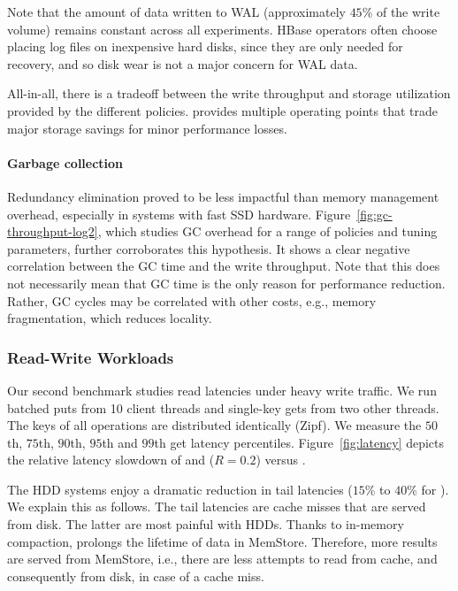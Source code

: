 Note that the amount of data written to WAL %
(approximately $45$\% of the write volume) remains constant across all  experiments. 
HBase operators often choose placing log files on inexpensive hard disks, since they are only needed for recovery,
and so disk wear is not a major concern for WAL data.

All-in-all, there is a tradeoff between the write throughput and storage utilization 
provided by the different \sys\/ policies. \adp\/ provides multiple operating points that trade major 
storage savings for minor performance losses.

\paragraph{Garbage collection}
 Redundancy elimination proved to be less impactful 
than memory management overhead, especially in systems with fast SSD hardware. 
Figure~\ref{fig:gc-throughput-log2}, which studies GC overhead for a range of policies and tuning 
parameters, further corroborates this hypothesis. It shows a clear negative correlation between the 
GC time and the write throughput. 
Note that this does not necessarily mean that GC time is the only reason for performance reduction. Rather,
GC cycles may be correlated with other costs, e.g., memory fragmentation, which reduces locality.


\subsubsection{Read-Write Workloads}

Our second benchmark studies read latencies under heavy write traffic. 
We run batched puts from 10 client threads and single-key gets from two other threads. 
The keys of all operations are distributed identically (Zipf). We measure the $50$th, 
$75$th, $90$th, $95$th and $99$th get latency percentiles. Figure~\ref{fig:latency} 
depicts the relative latency slowdown of \basic\/ and \adp\/ ($R=0.2$) versus \none.

The HDD systems enjoy a dramatic reduction in tail latencies ($15$\% to $40$\% for \adp). 
We explain this as follows. The tail latencies are cache misses that are served from disk. 
The latter are most painful with HDDs. Thanks to in-memory compaction, \adp\/ prolongs 
the lifetime of data in MemStore. Therefore, more results are served from MemStore, i.e., 
there are less attempts to read from cache, and consequently from disk, in case of a cache miss.  

